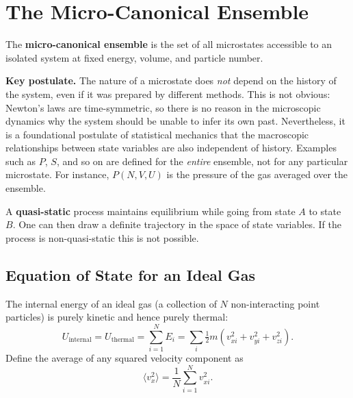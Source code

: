 

\section{The Micro-Canonical Ensemble}

\begin{definition}
The \textbf{micro-canonical ensemble} is the set of all microstates accessible to an isolated
system at fixed energy, volume, and particle number.
\end{definition}

\begin{fact}
\textbf{Key postulate.} The nature of a microstate does \emph{not} depend on the history of the
system, even if it was prepared by different methods. This is not obvious: Newton's laws are
time-symmetric, so there is no reason in the microscopic dynamics why the system should be unable
to infer its own past. Nevertheless, it is a foundational postulate of statistical mechanics that
the macroscopic relationships between state variables are also independent of history. Examples
such as $P$, $S$, and so on are defined for the \emph{entire} ensemble, not for any particular
microstate. For instance, $P(N,V,U)$ is the pressure of the gas averaged over the ensemble.
\end{fact}

\begin{definition}
A \textbf{quasi-static} process maintains equilibrium while going from state $A$ to state $B$.
One can then draw a definite trajectory in the space of state variables. If the process is
non-quasi-static this is not possible.
\end{definition}

\subsection{Equation of State for an Ideal Gas}

The internal energy of an ideal gas (a collection of $N$ non-interacting point particles) is
purely kinetic and hence purely thermal:
\begin{equation}
  U_{\text{internal}} = U_{\text{thermal}} = \sum_{i=1}^{N} E_i
  = \sum_{i} \tfrac{1}{2}m\!\left(v_{xi}^2 + v_{yi}^2 + v_{zi}^2\right).
\end{equation}
Define the average of any squared velocity component as
\begin{equation}
  \langle v_x^2 \rangle = \frac{1}{N}\sum_{i=1}^{N} v_{xi}^2.
\end{equation}

